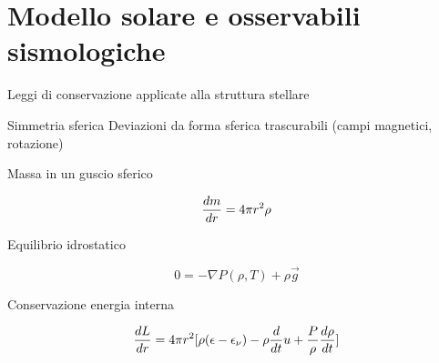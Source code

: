 \documentclass[10pt,xcolor={usenames},fleqn,mathserif,serif]{beamer}
\begin{document}
\part{Modello solare e osservabili sismologiche}\label{part:MSS}
\frame{\partpage}




\begin{frame}{Leggi di conservazione applicate alla struttura stellare}


\begin{block}{Simmetria sferica}
Deviazioni da forma sferica trascurabili (campi magnetici, rotazione)
\end{block}

\begin{block}{Massa in un guscio sferico}

\begin{equation*}
\TDy{r}{m}=4\pi r^2\rho
\end{equation*}

\end{block}

\begin{block}{Equilibrio idrostatico}

\begin{equation*}
0=-\nabla P(\rho,T)+\rho\vec{g}
\end{equation*}

\end{block}

\begin{block}{Conservazione energia interna}

\begin{equation*}
\TDy{r}{L}=4\pi r^2[\rho(\epsilon-\epsilon_{\nu})-\rho\TDof{t}u+\frac{P}{\rho}\TDy{t}{\rho}]
\end{equation*}


\end{block}
\end{frame}
\end{document}
